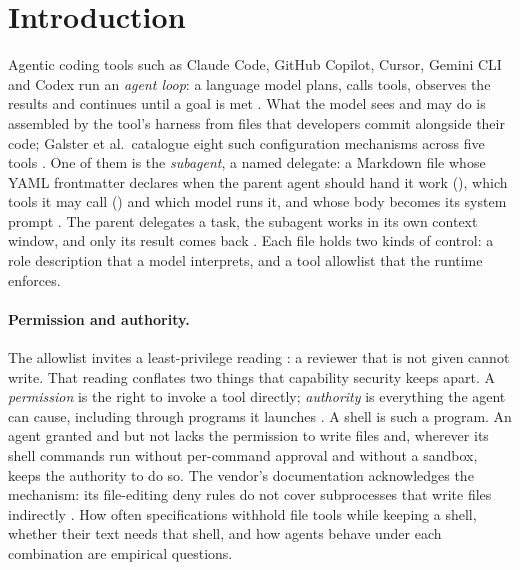 
\section{Introduction}
\label{sec:intro}

Agentic coding tools such as Claude Code, GitHub Copilot, Cursor, Gemini CLI and Codex run an \emph{agent loop}: a
language model plans, calls tools, observes the results and continues until a goal is met
\citep{Galster2026Harness,he2025lmase}. What the model sees and may do is assembled by the tool's harness from files
that developers commit alongside their code; Galster et al.\ catalogue eight such configuration mechanisms across five
tools \citep{Galster2026Configuring,Galster2026Harness}. One of them is the \emph{subagent}, a named delegate: a Markdown file whose YAML frontmatter declares when the parent agent
should hand it work (), which tools it may call () and which model runs it, and whose
body becomes its system prompt \citep{AnthropicSubagentsDoc}. The parent delegates a task, the subagent works in its
own context window, and only its result comes back \citep{hua2025contextengineering2,Liu2026DiveClaudeCode}. Each
file holds two kinds of control: a role description that a model interprets, and a tool allowlist that
the runtime enforces.

\paragraph{Permission and authority.}
The allowlist invites a least-privilege reading \citep{saltzer1975protection}: a reviewer that is not given
 cannot write. That reading conflates two things that capability security keeps apart. A
\emph{permission} is the right to invoke a tool directly; \emph{authority} is everything the agent can cause,
including through programs it launches \citep[\S8.1]{miller2006robust}. A shell is such a program. An agent granted
 and  but not  lacks the permission to write files and, wherever its shell commands
run without per-command approval and without a sandbox, keeps the authority to do so. The vendor's documentation
acknowledges the mechanism: its file-editing deny rules do not cover subprocesses that write files indirectly
\citep{AnthropicPermissionsDoc}. How often specifications withhold file tools while keeping
a shell, whether their text needs that shell, and how agents behave under each combination are empirical questions.


